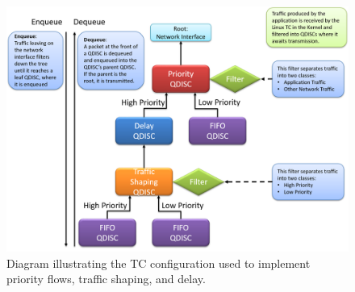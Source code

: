 \begin{figure}[ht!]
  \centering
  \includegraphics[width=\textwidth]{./figs/tc_diagram.png}
  \caption{Diagram illustrating the TC configuration used to implement
    priority flows, traffic shaping, and delay.}
  \label{fig:tc_diagram}
\end{figure}
